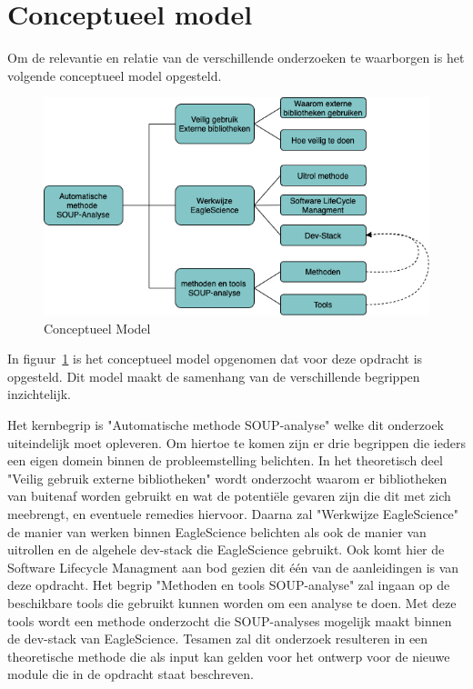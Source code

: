 \section{Conceptueel model}\label{sec:conceptueel-model}
Om de relevantie en relatie van de verschillende onderzoeken te waarborgen is het volgende conceptueel model opgesteld.
\begin{figure}[H]
    \centering
    \includegraphics[width=12cm]{gfx/Conceptueel Model}
    \caption{Conceptueel Model}
    \label{fig:ConceptueelModel}
\end{figure}

In figuur~\ref{fig:ConceptueelModel} is het conceptueel model opgenomen dat voor deze opdracht is opgesteld. Dit model maakt de samenhang van de verschillende begrippen inzichtelijk.

Het kernbegrip is "Automatische methode SOUP-analyse" welke dit onderzoek uiteindelijk moet opleveren. Om hiertoe te komen zijn er drie begrippen die ieders een eigen domein binnen de probleemstelling belichten. In het theoretisch deel "Veilig gebruik externe bibliotheken" wordt onderzocht waarom er bibliotheken van buitenaf worden gebruikt en wat de potentiële gevaren zijn die dit met zich meebrengt, en eventuele remedies hiervoor. Daarna zal "Werkwijze EagleScience" de manier van werken binnen EagleScience belichten als ook de manier van uitrollen en de algehele dev-stack die EagleScience gebruikt. Ook komt hier de Software Lifecycle Managment aan bod gezien dit één van de aanleidingen is van deze opdracht. Het begrip "Methoden en tools SOUP-analyse" zal ingaan op de beschikbare tools die gebruikt kunnen worden om een analyse te doen. Met deze tools wordt een methode onderzocht die SOUP-analyses mogelijk maakt binnen de dev-stack van EagleScience. Tesamen zal dit onderzoek resulteren in een theoretische methode die als input kan gelden voor het ontwerp voor de nieuwe module die in de opdracht staat beschreven.


